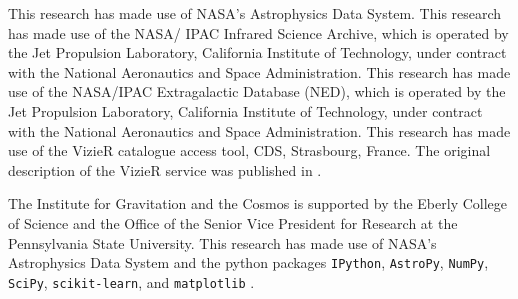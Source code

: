 \documentclass[preprint,natbib209]{aastex}
\begin{document}
This research has made use of NASA's Astrophysics Data System.
This research has made use of the NASA/ IPAC Infrared Science Archive, 
which is operated by the Jet Propulsion Laboratory, California Institute of Technology, 
under contract with the National Aeronautics and Space Administration.
This research has made use of the NASA/IPAC Extragalactic Database (NED), 
which is operated by the Jet Propulsion Laboratory, California Institute of Technology, 
under contract with the National Aeronautics and Space Administration.
This research has made use of the VizieR catalogue access tool, CDS,
Strasbourg, France. The original description of the VizieR service was
published in \cite{vizier}.

The Institute for Gravitation and the Cosmos is 
supported by the Eberly College of Science and the Office of the Senior Vice
President for Research at the Pennsylvania 
State University. This research has made use of NASA's Astrophysics Data System 
and the python packages \texttt{IPython}, \texttt{AstroPy}, 
\texttt{NumPy}, \texttt{SciPy}, \texttt{scikit-learn}, and \texttt{matplotlib}
 \citep{ipython, astropy, numpy, scipy, scikit-learn, matplotlib}.



\end{document}
